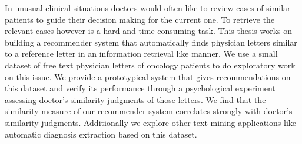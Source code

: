 \documentclass[Thesis.tex]{subfiles}
\begin{document}
\setlength{\parindent}{0cm}
In unusual clinical situations doctors would often like to review cases of similar patients to guide their decision making for the current one. To retrieve the relevant cases however is a hard and time consuming task. This thesis works on building a recommender system that automatically finds physician letters similar to a reference letter in an information retrieval like manner. We use a small dataset of free text physician letters of oncology patients to do exploratory work on this issue. We provide a prototypical system that gives recommendations on this dataset and verify its performance through a psychological experiment assessing doctor's similarity judgments of those letters. We find that the similarity measure of our recommender system correlates strongly with doctor's similarity judgments. Additionally we explore other text mining applications like automatic diagnosis extraction based on this dataset.
\end{document}
